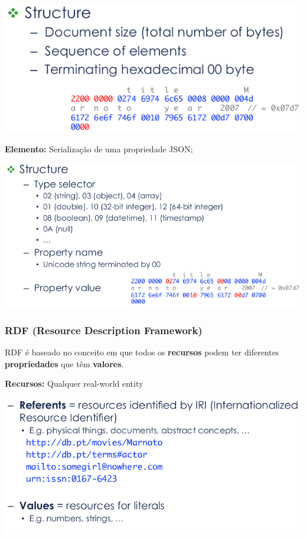 \documentclass{article}
\begin{document}
\begin{center}
  \includegraphics[scale=0.3]{58}
\end{center}

\begin{flushleft}
  \textbf{Elemento:} Serialização de uma propriedade JSON;
\end{flushleft}

\begin{center}
  \includegraphics[scale=0.3]{59}
\end{center}

\subsubsection{RDF (Resource Description Framework)}

RDF é baseado no conceito em que todos os \textbf{recursos} podem ter diferentes \textbf{propriedades}
que têm \textbf{valores}.

\begin{flushleft}
  \textbf{Recursos:} Qualquer real-world entity
\end{flushleft}

\begin{center}
  \includegraphics[scale=0.3]{60}
\end{center}
\end{document}

